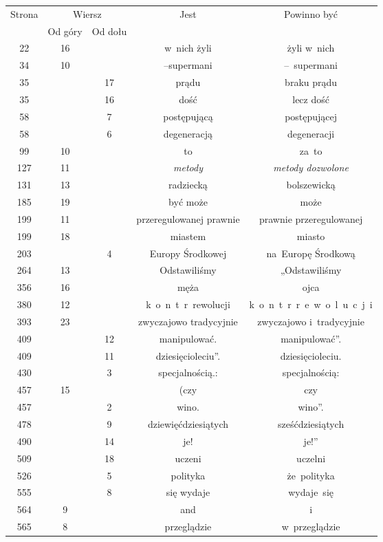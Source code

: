 \documentclass[a4paper,11pt]{article}
\numberwithin{equation}{section}
\begin{document}
\begin{center}

  \begin{tabular}{|c|c|c|c|c|}
    \hline
    Strona & \multicolumn{2}{c|}{Wiersz} & Jest
                              & Powinno być \\ \cline{2-3}
    & Od góry & Od dołu & & \\
    \hline
    22  & 16 & & w~nich żyli & żyli w~nich \\
    34  & 10 & & --supermani & --~supermani \\
    35  & & 17 & prądu & braku prądu \\
    35  & & 16 & dość & lecz dość \\
    58  & &  7 & postępującą & postępującej \\
    58  & &  6 & degeneracją & degeneracji \\
    99  & 10 & & to & za~to \\
    127 & 11 & & \textit{metody} & \textit{metody dozwolone} \\
    131 & 13 & & radziecką & bolszewicką \\
    185 & 19 & & być może & może \\
    199 & 11 & & przeregulowanej prawnie & prawnie przeregulowanej \\
    199 & 18 & & miastem & miasto \\
    203 & &  4 & Europy Środkowej & na~Europę Środkową \\
    264 & 13 & & Odstawiliśmy & „Odstawiliśmy \\
    356 & 16 & & męża & ojca \\
    380 & 12 & & k~o~n~t~r~rewolucji & k~o~n~t~r~r~e~w~o~l~u~c~j~i \\
    393 & 23 & & zwyczajowo tradycyjnie & zwyczajowo i~tradycyjnie \\
    409 & & 12 & manipulować. & manipulować''. \\
    409 & & 11 & dziesięcioleciu''. & dziesięcioleciu. \\
    430 & &  3 & specjalnością.: & specjalnością: \\
    457 & 15 & & (czy & czy \\
    457 & &  2 & wino. & wino''. \\
    478 & &  9 & dziewięćdziesiątych & sześćdziesiątych \\
    490 & & 14 & je! & je!'' \\
    509 & & 18 & uczeni & uczelni \\
    526 & &  5 & polityka & że~polityka \\
    555 & &  8 & się wydaje & wydaje~się \\
    564 &  9 & & and & i \\
    565 &  8 & & przeglądzie & w~przeglądzie \\
    \hline
  \end{tabular}






\end{center}
\end{document}
